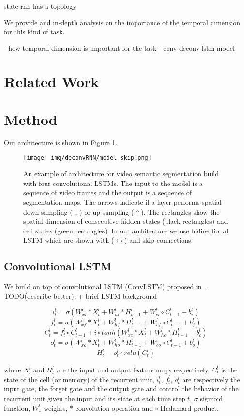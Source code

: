 state rnn has a topology

We provide and in-depth analysis on the importance of the temporal dimension
for this kind of task.

- how temporal dimension is important for the task
- conv-deconv lstm model


\section{Related Work}
\label{sec:sota}


\section{Method}

Our architecture is shown in Figure \ref{fig:method}.
\label{sec:method}
\begin{figure}
\centering
\texttt{[image: img/deconvRNN/model\_skip.png]}
\label{fig:method}
\caption{An example of architecture for video semantic segmentation build with
four convolutional LSTMs. The input to the model is a sequence of video frames
and the output is a sequence of segmentation maps. The arrows indicate if a
layer performs spatial down-sampling ($\downarrow$) or up-sampling
($\uparrow$). The rectangles show the spatial dimension of consecutive hidden
states (black rectangles) and cell states (green rectangles). In our
architecture we use bidirectional LSTM which are shown with ($\leftrightarrow$)
and skip connections.}
\end{figure}


\subsection{Convolutional LSTM}
We build on top of convolutional LSTM (ConvLSTM) proposed in~\cite{ShiCWYWW15}.
TODO(describe better). + brief LSTM background


\[ i_t^{l} = \sigma(W_{xi}^{l}*X_t^{l} + W_{hi}^{l}*H_{t-1}^{l} + W_{ci}^{l} \circ C_{t-1}^{l} + b_i^{l})\]
\[ f_t^{l} = \sigma(W_{xf}^{l}*X_t^{l} + W_{hf}^{l}*H_{t-1}^{l} + W_{cf}^{l} \circ C_{t-1}^{l} + b_f^{l})\]
\[ C_t^{l} = f_t^{l} \circ C_{t-1}^{l} + i \circ tanh(W_{xc}^{l}*X_t^{l} + W_{hc}^{l}*H_{t-1}^{l} + b_c^{l})\]
\[ o_t^{l} = \sigma(W_{xo}^{l}*X_t^{l} + W_{ho}^{l}*H_{t-1}^{l} + W_{co}^{l} \circ C_{t-1}^{l} + b_o^{l})\]
\[ H_t^{l} = o_t^{l} \circ relu(C_t^{l})\]

where \(X_t^{l}\) and \(H_t^{l}\) are the input and output feature maps
respectively, \(C_t^{l}\) is the state of the cell (or memory) of the recurrent
unit, \(i_t^{l}\), \(f_t^{l}\), \(o_t^{l}\) are respectively the input gate,
the forget gate and the output gate and control the behavior of the recurrent
unit given the input and its state at each time step $t$.
\(\sigma\) sigmoid function, \(W_{\star}^{l}\) weights, \(*\) convolution
operation and \(\circ\) Hadamard product.

